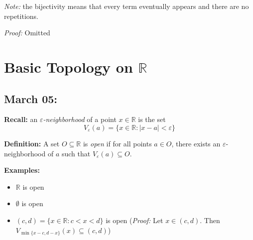 \documentclass[12pt]{report}
\newcommand{\R}{\mathbb{R}}
\newcommand{\abs}[1]{\left\vert #1 \right\vert}
\newcommand{\ep}{\varepsilon}
\newenvironment*{tbox}[2][gray]{
    \begin{tcolorbox}[
        parbox=false,
        colback=#1!5!white,
        colframe=#1!75!black,
        breakable,
        title={#2}
    ]}
    {\end{tcolorbox}}
\begin{document}
    \emph{Note:} the bijectivity means that every term eventually appears and there are no repetitions.

    \begin{tbox}{\textbf{Theorem:} If $\sum_{n=1}^{\infty} a_n$ converges absolutely, then every rearrangement of the series converges to the same limit.}
        \emph{Proof:} Omitted
    \end{tbox}

\chapter{Basic Topology on $\R$}
\section*{March 05:}
    \textbf{Recall:} an \emph{$\ep$-neighborhood} of a point $x \in \R$ is the set
    \[V_{\ep}(a) = \{x \in \R: \abs{x - a} < \ep\}\]

    \textbf{Definition:} A set $O \subseteq \R$ is \emph{open} if for all points $a \in O$, there exists an $\ep$-neighborhood of $a$ such that $V_{\ep}(a) \subseteq O$.

    \textbf{Examples:}
    \begin{itemize}
        \item $\R$ is open
        \item $\emptyset$ is open
        \item $(c, d) = \{x \in \R: c < x < d\}$ is open (\emph{Proof:} Let $x \in (c, d)$. Then $V_{\min\{x-c, d-x\}}(x) \subseteq (c, d)$)
    \end{itemize}
\end{document}
